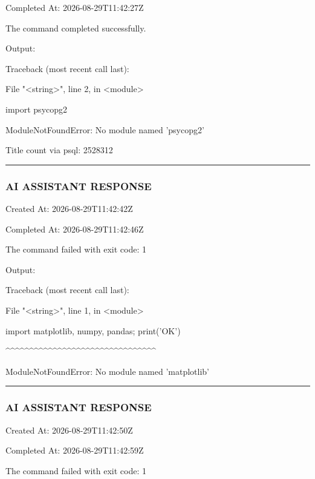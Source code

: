 \documentclass[11pt,a4paper]{article}
\begin{document}
Completed At: 2026-08-29T11:42:27Z


The command completed successfully.

Output:

Traceback (most recent call last):

File "<string>", line 2, in <module>

import psycopg2

ModuleNotFoundError: No module named 'psycopg2'

Title count via psql: 2528312


\hrule

\subsubsection{AI ASSISTANT RESPONSE}

Created At: 2026-08-29T11:42:42Z

Completed At: 2026-08-29T11:42:46Z


The command failed with exit code: 1

Output:

Traceback (most recent call last):

File "<string>", line 1, in <module>

import matplotlib, numpy, pandas; print('OK')

\textasciicircum{}\textasciicircum{}\textasciicircum{}\textasciicircum{}\textasciicircum{}\textasciicircum{}\textasciicircum{}\textasciicircum{}\textasciicircum{}\textasciicircum{}\textasciicircum{}\textasciicircum{}\textasciicircum{}\textasciicircum{}\textasciicircum{}\textasciicircum{}\textasciicircum{}\textasciicircum{}\textasciicircum{}\textasciicircum{}\textasciicircum{}\textasciicircum{}\textasciicircum{}\textasciicircum{}\textasciicircum{}\textasciicircum{}\textasciicircum{}\textasciicircum{}\textasciicircum{}\textasciicircum{}\textasciicircum{}\textasciicircum{}

ModuleNotFoundError: No module named 'matplotlib'


\hrule

\subsubsection{AI ASSISTANT RESPONSE}

Created At: 2026-08-29T11:42:50Z

Completed At: 2026-08-29T11:42:59Z


The command failed with exit code: 1
\end{document}
